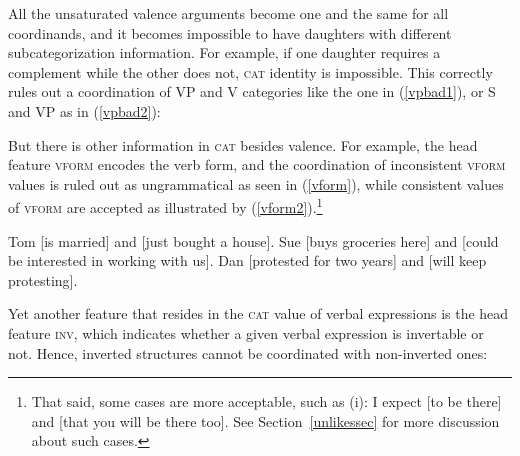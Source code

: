 All the unsaturated valence arguments become one and the same for all coordinands, and it becomes impossible to have daughters with different subcategorization information. For example, if one daughter requires a complement while the other does not,
\textsc{cat} identity  is impossible. This correctly rules out  a coordination of  VP and V categories
like the one in (\ref{vpbad1}), or S and VP as in (\ref{vpbad2}):

\eal
{}\label{vpbad1}
\label{vpbad2}
\zl

\noindent
But there is other information in \textsc{cat} besides valence. For example, the head feature
\textsc{vform} encodes the verb form, and the coordination of inconsistent \textsc{vform} values is
ruled out as ungrammatical as seen in (\ref{vform}), while consistent values of \textsc{vform} are
accepted as illustrated by (\ref{vform2}).\footnote{%
That said, some cases are more acceptable, such as (i):
\ea
I expect [to be there] and [that you will be there too].
\z
See Section~\ref{unlikessec} for more discussion about such cases.}


\eal
\label{vform}
\zl



\ealnoraggedright
\label{vform2}
\ex Tom [is married] and [just bought  a house].
\ex Sue [buys groceries here] and [could be interested in working with us].
\ex Dan [protested for two years] and [will keep protesting].
\zl

\largerpage[2]
Yet another feature that resides in the \textsc{cat} value of verbal expressions is the head feature
\textsc{inv}, which indicates whether a given verbal expression is invertable or not. Hence,
inverted structures cannot be coordinated with non-inverted ones: 


\eal
{}
\zl

